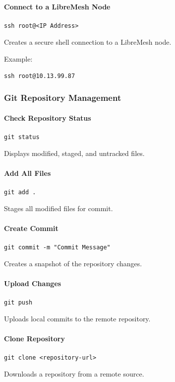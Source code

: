 \documentclass[conference]{IEEEtran}
\begin{document}
\paragraph{Connect to a LibreMesh Node}
\begin{verbatim}
ssh root@<IP Address>
\end{verbatim}
Creates a secure shell connection to a LibreMesh node.

Example:
\begin{verbatim}
ssh root@10.13.99.87
\end{verbatim}

\subsubsection{Git Repository Management}

\paragraph{Check Repository Status}
\begin{verbatim}
git status
\end{verbatim}
Displays modified, staged, and untracked files.

\paragraph{Add All Files}
\begin{verbatim}
git add .
\end{verbatim}
Stages all modified files for commit.

\paragraph{Create Commit}
\begin{verbatim}
git commit -m "Commit Message"
\end{verbatim}
Creates a snapshot of the repository changes.

\paragraph{Upload Changes}
\begin{verbatim}
git push
\end{verbatim}
Uploads local commits to the remote repository.

\paragraph{Clone Repository}
\begin{verbatim}
git clone <repository-url>
\end{verbatim}
Downloads a repository from a remote source.
\end{document}
